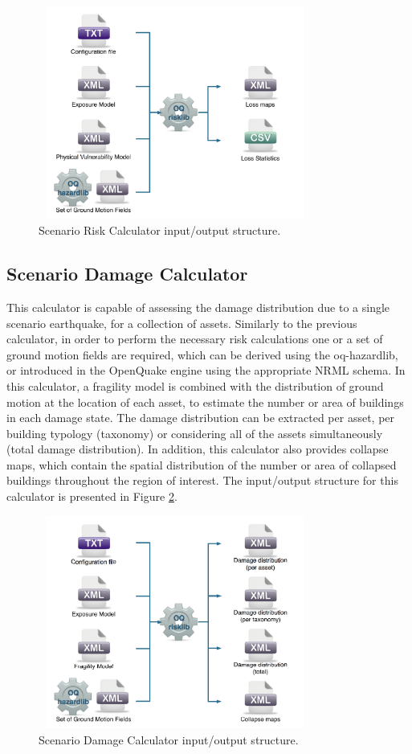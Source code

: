 \begin{figure}[ht]
\centering
\includegraphics[width=9cm,height=7cm]{./figures/risk/ScenarioRisk.pdf}
\caption{Scenario Risk Calculator input/output structure.}
\label{fig:ScnRisk}
\end{figure}

\subsection{Scenario Damage Calculator}
This calculator is capable of assessing the damage distribution due to a single scenario earthquake, for a collection of assets. Similarly to the previous calculator, in order to perform the necessary risk calculations one or a set of ground motion fields are required, which can be derived using the oq-hazardlib, or introduced in the OpenQuake engine using the appropriate NRML schema.
In this calculator, a fragility model is combined with the distribution of ground motion at the location of each asset, to estimate the number or area of buildings in each damage state. The damage distribution can be extracted per asset, per building typology (taxonomy) or considering all of the assets simultaneously (total damage distribution). In addition, this calculator also provides collapse maps, which contain the spatial distribution of the number or area of collapsed buildings throughout the region of interest. The input/output structure for this calculator is presented in Figure \ref{fig:ScnDamage}.

\begin{figure}[ht]
\centering
\includegraphics[width=9cm,height=7cm]{./figures/risk/ScenarioDamage.pdf}
\caption{Scenario Damage Calculator input/output structure.}
\label{fig:ScnDamage}
\end{figure}

